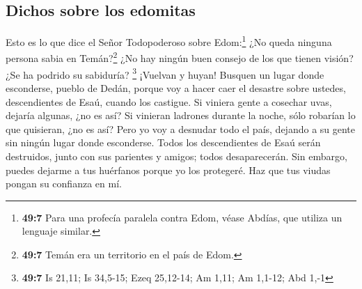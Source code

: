 \hypertarget{dichos-sobre-los-edomitas}{%
\subsection{Dichos sobre los edomitas}\label{dichos-sobre-los-edomitas}}

 Esto es lo que dice el Señor Todopoderoso sobre
Edom:\footnote{\textbf{49:7} Para una profecía paralela contra Edom,
  véase Abdías, que utiliza un lenguaje similar.} ¿No queda ninguna
persona sabia en Temán?\footnote{\textbf{49:7} Temán era un territorio
  en el país de Edom.} ¿No hay ningún buen consejo de los que tienen
visión? ¿Se ha podrido su sabiduría? \footnote{\textbf{49:7} Is 21,11;
  Is 34,5-15; Ezeq 25,12-14; Am 1,11; Am 1,1-12; Abd 1,-1}
 ¡Vuelvan y huyan! Busquen un lugar donde esconderse,
pueblo de Dedán, porque voy a hacer caer el desastre sobre ustedes,
descendientes de Esaú, cuando los castigue.  Si viniera
gente a cosechar uvas, dejaría algunas, ¿no es así? Si vinieran ladrones
durante la noche, sólo robarían lo que quisieran, ¿no es así?
 Pero yo voy a desnudar todo el país, dejando a su gente
sin ningún lugar donde esconderse. Todos los descendientes de Esaú serán
destruidos, junto con sus parientes y amigos; todos desaparecerán.
 Sin embargo, puedes dejarme a tus huérfanos porque yo
los protegeré. Haz que tus viudas pongan su confianza en mí.


